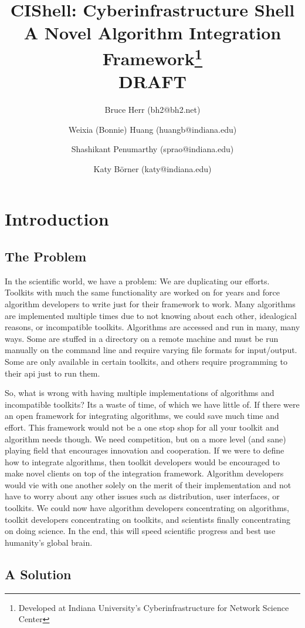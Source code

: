 \documentclass[a4]{article}
\title{CIShell: Cyberinfrastructure Shell\\A Novel Algorithm Integration
Framework\thanks{Developed at Indiana University's Cyberinfrastructure for
Network Science Center}\\
\textbf{DRAFT}
}
\author{Bruce Herr (bh2@bh2.net) 
\and Weixia (Bonnie) Huang (huangb@indiana.edu)
\and Shashikant Penumarthy (sprao@indiana.edu)
\and Katy B\"{o}rner (katy@indiana.edu)
}
\begin{document}
\maketitle{}
\tableofcontents{}

\newpage{}

\section{Introduction}

\subsection{The Problem}

In the scientific world, we have a problem: We are duplicating our efforts.
Toolkits with much the same functionality are worked on for years and force
algorithm developers to write just for their framework to work. Many algorithms
are implemented multiple times due to not knowing about each other, idealogical
reasons, or incompatible toolkits. Algorithms are accessed and run in many,
many ways. Some are stuffed in a directory on a remote machine and must be
run manually on the command line and require varying file formats for
input/output. Some are only available in certain toolkits, and others require
programming to their api just to run them.

So, what is wrong with having multiple implementations of algorithms and 
incompatible toolkits? Its a waste of time, of which we have little of. If 
there were an open framework for integrating algorithms, we could save much 
time and effort. This framework would not be a one stop shop for all your 
toolkit and algorithm needs though. We need competition, but on a more level 
(and sane) playing field that encourages innovation and cooperation. If we were 
to define how to integrate algorithms, then toolkit developers would be 
encouraged to make novel clients on top of the integration framework. Algorithm 
developers would vie with one another solely on the merit of their 
implementation and not have to worry about any other issues such as 
distribution, user interfaces, or toolkits. We could now have algorithm 
developers concentrating on algorithms, toolkit developers concentrating on 
toolkits, and scientists finally concentrating on doing science. In the end, 
this will speed scientific progress and best use humanity's global brain.

\subsection{A Solution}
\end{document}
